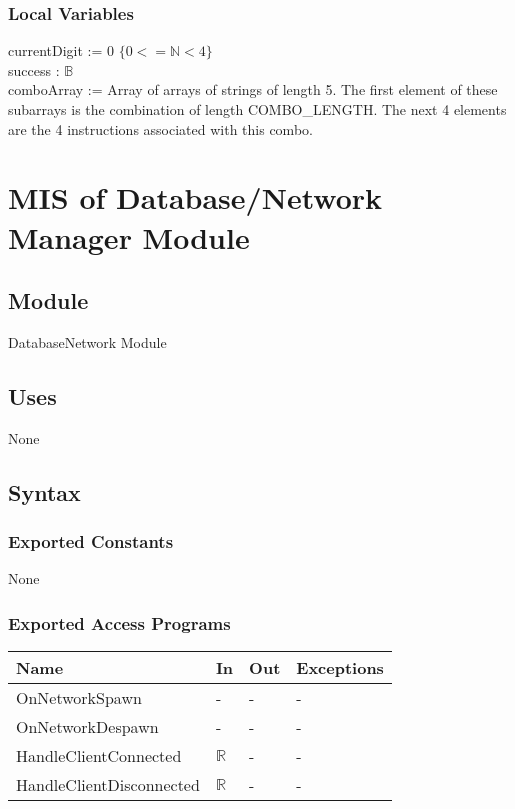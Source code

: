 \documentclass[12pt, titlepage]{article}
\begin{document}
\subsubsection{Local Variables}
currentDigit := 0 $\{0<=\mathbb{N}<4\}$\\
success : $\mathds{B}$\\
comboArray := Array of arrays of strings of length 5. The first element of these subarrays is the combination of length COMBO\_LENGTH. The next 4 elements are the 4 instructions associated with this combo.\\
\newpage

\section{MIS of Database/Network Manager Module} \label{DatabaseNetworkModule} 

\subsection{Module}

DatabaseNetwork Module

\subsection{Uses}

None

\subsection{Syntax}

\subsubsection{Exported Constants}

None

\subsubsection{Exported Access Programs}

\begin{center}
\begin{tabular}{p{5cm} p{4cm} p{4cm} p{2cm}}
\hline
\textbf{Name} & \textbf{In} & \textbf{Out} & \textbf{Exceptions} \\
\hline
OnNetworkSpawn & - & - & - \\
OnNetworkDespawn  & - & - & - \\
HandleClientConnected  & $\mathbb{R}$ & - & - \\
HandleClientDisconnected  & $\mathbb{R}$ & - & - \\
\hline
\end{tabular}
\end{center}
\end{document}
